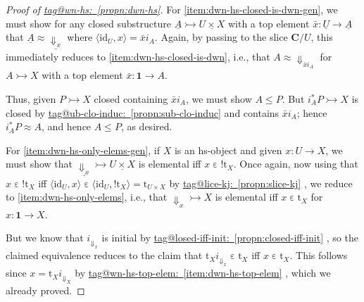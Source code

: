 \documentclass{amsart}
\makeatletter
\newcommand\bC{\mathbf{C}}
\newcommand\br[1]{\langle{}#1\rangle{}}
\newcommand\Dwn{{\Downarrow}}
\newcommand\ein{\mathrel{\varepsilon}}
\newcommand\id{\mathrm{id}}
\newcommand\rt{\mathrm{t}}
\newcommand\tm{\mathbf{1}}
\newcommand\tto{\rightarrowtail}
\newcommand\und[1]{\underline{#1}}
\newcommand\unex{{!}}
\newcommand\tagword[1]{\csname tag@#1\endcsname}
\def\label@tag#1:#2\@nil{#1}
\newcommand\labeltag[1]{\label@tag#1:\@nil}
\newcommand\jref[1]{%
  \texorpdfstring%
    {\hyperref[#1]{\tagword{\labeltag{#1}}~\ref*{#1}}}%
    {\tagword{\labeltag{#1}}~\ref*{#1}}%
}
\theoremstyle{definition}
\theoremstyle{remark}
\theoremstyle{plainwithref}
\makeatother
\begin{document}
\begin{proof}[Proof of \jref{propn:dwn-hs}]
  For \ref{item:dwn-hs-closed-is-dwn-gen}, we must show for any closed substructure \( \und A \tto \und{U \times X} \) with a top element \( \bar x \colon \und U \to \und A \) that \( \und A \approx \und{\Dwn_{x}} \) where \( \br{\id_U, x} = \bar x i_A \).
  Again, by passing to the slice \( \bC / U \), this immediately reduces to \ref{item:dwn-hs-closed-is-dwn}, i.e., that \( A \approx \Dwn_{\bar x i_A} \) for \( A \tto X \) with a top element \( \bar x \colon \tm \to A \).

  Thus, given \( P \tto X \) closed containing \( \bar x i_A \), we must show \( A \le P \).
  But \( i_A^* P \tto X \) is closed by \jref{propn:sub-clo-induc} and contains \( \bar x i_A \); hence \( i_A^* P \approx A \), and hence \( A \le P \), as desired.

  For \ref{item:dwn-hs-only-elems-gen}, if \( X \) is an hs-object and given \( x \colon U \to X \), we must show that \( \und{\Dwn_x} \tto \und{U \times X} \) is elemental iff \( x \ein \unex \rt_X \).
  Once again, now using that \( x \ein \unex \rt_X \) iff \( \br{\id_U, x} \ein \br{\id_U, \unex \rt_X} = \rt_{U \times X} \) by \jref{propn:slice-kj}, we reduce to \ref{item:dwn-hs-only-elems}, i.e., that \( \Dwn_x \tto X \) is elemental iff \( x \ein \rt_X \) for \( x \colon \tm \to X \).

  But we know that \( i_{\Dwn_x} \) is initial by \jref{propn:closed-iff-init}, so the claimed equivalence reduces to the claim that \( \rt_X i_{\Dwn_x} \ein \rt_X \) iff \( x \ein \rt_X \).
  This follows since \( x = \rt_X i_{\Dwn_X} \) by \jref{item:dwn-hs-top-elem}, which we already proved.
\end{proof}
\end{document}

